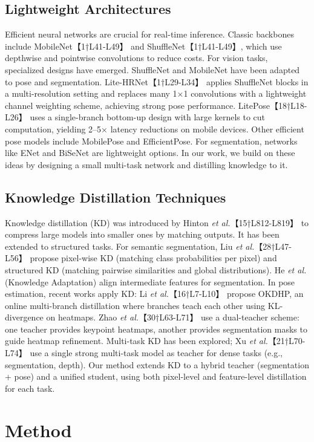 \documentclass{article}
\begin{document}
\subsection{Lightweight Architectures}
Efficient neural networks are crucial for real-time inference. Classic backbones include MobileNet【1†L41-L49】 and ShuffleNet【1†L41-L49】, which use depthwise and pointwise convolutions to reduce costs. For vision tasks, specialized designs have emerged. ShuffleNet and MobileNet have been adapted to pose and segmentation. Lite-HRNet【1†L29-L34】 applies ShuffleNet blocks in a multi-resolution setting and replaces many 1×1 convolutions with a lightweight channel weighting scheme, achieving strong pose performance. LitePose【18†L18-L26】 uses a single-branch bottom-up design with large kernels to cut computation, yielding 2–5× latency reductions on mobile devices. Other efficient pose models include MobilePose and EfficientPose. For segmentation, networks like ENet and BiSeNet are lightweight options. In our work, we build on these ideas by designing a small multi-task network and distilling knowledge to it.

\subsection{Knowledge Distillation Techniques}
Knowledge distillation (KD) was introduced by Hinton \textit{et al.}【15†L812-L819】 to compress large models into smaller ones by matching outputs. It has been extended to structured tasks. For semantic segmentation, Liu \textit{et al.}【28†L47-L56】 propose pixel-wise KD (matching class probabilities per pixel) and structured KD (matching pairwise similarities and global distributions). He \textit{et al.} (Knowledge Adaptation) align intermediate features for segmentation. In pose estimation, recent works apply KD: Li \textit{et al.}【16†L7-L10】 propose OKDHP, an online multi-branch distillation where branches teach each other using KL-divergence on heatmaps. Zhao \textit{et al.}【30†L63-L71】 use a dual-teacher scheme: one teacher provides keypoint heatmaps, another provides segmentation masks to guide heatmap refinement. Multi-task KD has been explored; Xu \textit{et al.}【21†L70-L74】 use a single strong multi-task model as teacher for dense tasks (e.g., segmentation, depth). Our method extends KD to a hybrid teacher (segmentation + pose) and a unified student, using both pixel-level and feature-level distillation for each task.

\section{Method}
\end{document}

